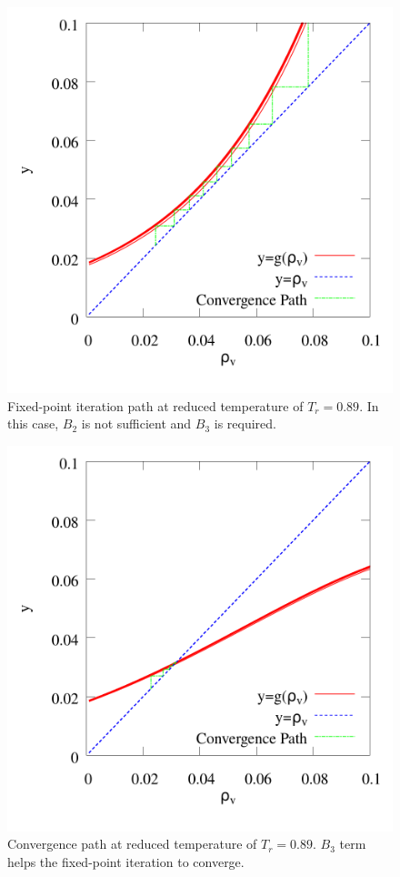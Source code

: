 \documentclass[%
 aip,
 jcp,
 sd,%
 amsmath,amssymb,
 reprint,%
]{revtex4-1}
\begin{document}
\begin{figure}
\includegraphics[scale=0.25]{Figures/Diverge-C12-FTF-B2+15_rho-048030gcc.png}
\caption{Fixed-point iteration path at reduced temperature of $T_r=0.89$. In this case, $B_2$ is not sufficient and $B_3$ is required.}
\label{fig:Diverge-C12-FTF-B2+15_rho-048030gcc}
\end{figure}

\begin{figure}
\includegraphics[scale=0.25]{Figures/Converge-C12-FTT-B3+15-rho_048030gcc.png}
\caption{Convergence path at reduced temperature of $T_r=0.89$. $B_3$ term helps the fixed-point iteration to converge.}
\label{fig:Converge-C12-FTT-B3+15-rho_048030gcc}
\end{figure}
\end{document}
